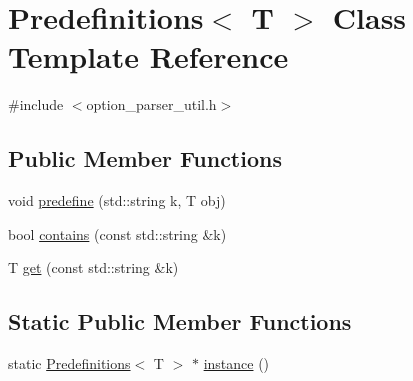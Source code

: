 \hypertarget{classPredefinitions}{\section{Predefinitions$<$ T $>$ Class Template Reference}
\label{classPredefinitions}
}


{\ttfamily \#include $<$option\-\_\-parser\-\_\-util.\-h$>$}

\subsection*{Public Member Functions}
\begin{DoxyCompactItemize}
\item 
void \hyperlink{classPredefinitions_a2adfe1ebb059e11a385db17f5a252ead}{predefine} (std\-::string k, T obj)
\item 
bool \hyperlink{classPredefinitions_a1a17c2b4de658cd19625a9d5c618b1a5}{contains} (const std\-::string \&k)
\item 
T \hyperlink{classPredefinitions_ac2e64ee203c0731c16f906a2f8dc2d7e}{get} (const std\-::string \&k)
\end{DoxyCompactItemize}
\subsection*{Static Public Member Functions}
\begin{DoxyCompactItemize}
\item 
static \hyperlink{classPredefinitions}{Predefinitions}$<$ T $>$ $\ast$ \hyperlink{classPredefinitions_ad5359b7536ccab8bbdaf112ea3c899b8}{instance} ()
\end{DoxyCompactItemize}


